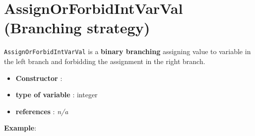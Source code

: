 \section{AssignOrForbidIntVarVal (Branching strategy)}\label{assignorforbidintvarval:assignorforbidintvarvalbranchstrat}\hypertarget{assignorforbidintvarval:assignorforbidintvarvalbranchstrat}{}
\begin{notedef}
  \texttt{AssignOrForbidIntVarVal} is a \textbf{binary branching} assigning value to variable in the left branch and forbidding the assignment in the right branch.  
\end{notedef}

\begin{itemize}
	\item \textbf{Constructor} :
	\item \textbf{type of variable} : integer
	\item \textbf{references} : \emph{n/a}
\end{itemize}

\textbf{Example}:
%

